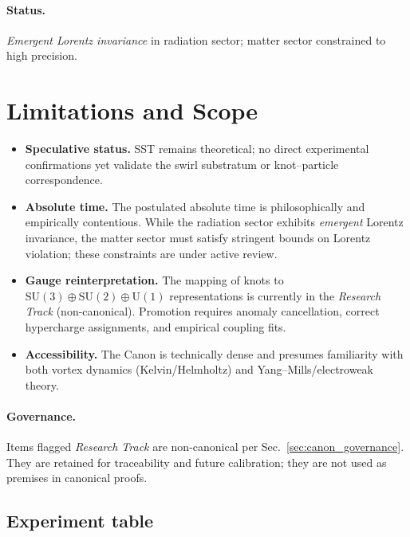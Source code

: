 \documentclass[11pt]{article}
\begin{document}
\paragraph{Status.} \emph{Emergent Lorentz invariance} in radiation sector; matter sector constrained to high precision.


\section{Limitations and Scope}
\label{sec:limitations}

\begin{tcolorbox}[colback=yellow!6!white,colframe=yellow!40!black,title={\Large\warning~ Limitations}]
	\begin{itemize}
		\item \textbf{Speculative status.} SST remains theoretical; no direct experimental confirmations yet validate the swirl substratum or knot–particle correspondence.
		\item \textbf{Absolute time.} The postulated absolute time is philosophically and empirically contentious. While the radiation sector exhibits \emph{emergent} Lorentz invariance, the matter sector must satisfy stringent bounds on Lorentz violation; these constraints are under active review.
		\item \textbf{Gauge reinterpretation.} The mapping of knots to \(\mathrm{SU}(3)\oplus\mathrm{SU}(2)\oplus\mathrm{U}(1)\) representations is currently in the \emph{Research Track} (non-canonical). Promotion requires anomaly cancellation, correct hypercharge assignments, and empirical coupling fits.
		\item \textbf{Accessibility.} The Canon is technically dense and presumes familiarity with both vortex dynamics (Kelvin/Helmholtz) and Yang–Mills/electroweak theory.
	\end{itemize}
\end{tcolorbox}

\paragraph{Governance.}
Items flagged \emph{Research Track} are non-canonical per Sec.~\ref{sec:canon_governance}.
They are retained for traceability and future calibration; they are not used as premises in canonical proofs.


\subsection*{Experiment table}
\end{document}
